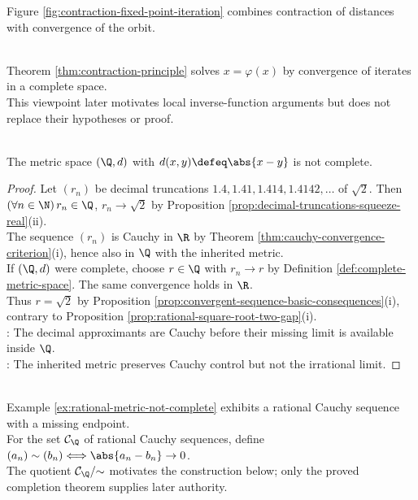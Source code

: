 Figure \ref{fig:contraction-fixed-point-iteration} combines contraction of distances with convergence of the orbit.
\begin{illustrationfigure}[H]
  \centering
  
  \caption{The iterates approach the fixed point $p$ while $\varphi$ contracts pairwise distances.}
  \label{fig:contraction-fixed-point-iteration}
\end{illustrationfigure}

\begin{perspective} \label{per:contractions-feed-local-analysis} \\
Theorem \ref{thm:contraction-principle} solves $x=\varphi(x)$ by convergence of iterates in a complete space.\\
This viewpoint later motivates local inverse-function arguments but does not replace their hypotheses or proof.
\end{perspective}

\begin{example} \label{ex:rational-metric-not-complete} \\
The metric space $(\Q,d)$ with $d(x,y)\defeq\abs{x-y}$ is not complete.
\begin{proof}
Let $(r_n)$ be decimal truncations $1.4,1.41,1.414,1.4142,\ldots$ of $\sqrt{2}$. Then $(\forall n\in\N)\,r_n\in\Q$, $r_n\to\sqrt{2}$ by Proposition \ref{prop:decimal-truncations-squeeze-real}(ii).\\
The sequence $(r_n)$ is Cauchy in $\R$ by Theorem \ref{thm:cauchy-convergence-criterion}(i), hence also in $\Q$ with the inherited metric.\\
If $(\Q,d)$ were complete, choose $r\in\Q$ with $r_n\to r$ by Definition \ref{def:complete-metric-space}. The same convergence holds in $\R$.\\
Thus $r=\sqrt{2}$ by Proposition \ref{prop:convergent-sequence-basic-consequences}(i), contrary to Proposition \ref{prop:rational-square-root-two-gap}(i).\\
: The decimal approximants are Cauchy before their missing limit is available inside $\Q$.\\
: The inherited metric preserves Cauchy control but not the irrational limit.
\end{proof}
\end{example}

\begin{perspective} \label{per:cauchy-construction-of-reals-parallel-model} \\
Example \ref{ex:rational-metric-not-complete} exhibits a rational Cauchy sequence with a missing endpoint.\\
For the set $\mathcal{C}_\Q$ of rational Cauchy sequences, define $(a_n)\sim(b_n)\Longleftrightarrow\abs{a_n-b_n}\to0$.\\
The quotient $\mathcal{C}_\Q/{\sim}$ motivates the construction below; only the proved completion theorem supplies later authority.
\end{perspective}

